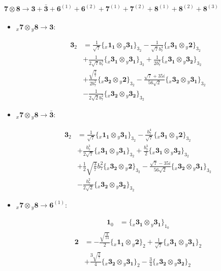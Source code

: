 \documentclass[english]{article}
\newcommand{\cgEqFontsize}{\large}
\newcommand{\rep}[1]{\mathbf{#1}}
\newcommand{\repx}[2]{{}_{#2}\mathbf{#1}}
\newcommand{\tsprod}[2]{\rep{#1}\otimes\rep{#2}}
\newcommand{\tsprodx}[2]{\repx{#1}{x}\otimes\repx{#2}{y}}
\newcommand{\subcgs}[3]{\big\{ \tsprodx{#1}{#2}\big\}^{}_{#3}}
\begin{document}
\paragraph*{\cgEqFontsize $\tsprod{7}{8}\to\rep{3}+\rep{\bar{3}}+\rep{6}^{(1)}+\rep{6}^{(2)}+\rep{7}^{(1)}+\rep{7}^{(2)}+\rep{8}^{(1)}+\rep{8}^{(2)}+\rep{8}^{(3)}$}
\begin{itemize}
\item $\tsprodx{7}{8}\to\rep{3}$:
\begin{fleqn}
\begin{align*}
\rep{3}_{2} & = \frac{1}{\sqrt{7}}\subcgs{1_{1}}{3_{1}}{3_{2}}-\frac{1}{\sqrt{7} b_7^4}\subcgs{3_{1}}{2}{3_{2}} \\ 
 & +\frac{1}{2 \sqrt{7} b_7^3}\subcgs{3_{1}}{3_{1}}{3_{2}}+\frac{1}{2 b_7^3}\subcgs{3_{1}}{3_{2}}{3_{2}} \\ 
 & +\frac{\sqrt{\frac{3}{7}}}{2 b_7^2}\subcgs{3_{2}}{2}{3_{2}}-\frac{\sqrt{7}+35 i}{56 \sqrt{2}}\subcgs{3_{2}}{3_{1}}{3_{2}} \\ 
 & -\frac{1}{2 \sqrt{2} b_7^2}\subcgs{3_{2}}{3_{2}}{3_{2}}
\end{align*}
\end{fleqn}
\item $\tsprodx{7}{8}\to\rep{\bar{3}}$:
\begin{fleqn}
\begin{align*}
\rep{3}_{2} & = \frac{1}{\sqrt{7}}\subcgs{1_{1}}{3_{1}}{3_{2}}-\frac{b_7^4}{\sqrt{7}}\subcgs{3_{1}}{2}{3_{2}} \\ 
 & +\frac{b_7^3}{2 \sqrt{7}}\subcgs{3_{1}}{3_{1}}{3_{2}}+\frac{b_7^3}{2}\subcgs{3_{1}}{3_{2}}{3_{2}} \\ 
 & +\frac{1}{2} \sqrt{\frac{3}{7}} b_7^2\subcgs{3_{2}}{2}{3_{2}}-\frac{\sqrt{7}-35 i}{56 \sqrt{2}}\subcgs{3_{2}}{3_{1}}{3_{2}} \\ 
 & -\frac{b_7^2}{2 \sqrt{2}}\subcgs{3_{2}}{3_{2}}{3_{2}}
\end{align*}
\end{fleqn}
\item $\tsprodx{7}{8}\to\rep{6}^{(1)}$:
\begin{fleqn}
\begin{align*}
\rep{1}_{0} & = \subcgs{3_{1}}{3_{1}}{1_{0}}
\end{align*}
\begin{align*}
\rep{2} & = -\frac{\sqrt{\frac{3}{14}}}{2}\subcgs{1_{1}}{2}{2}+\frac{1}{\sqrt{7}}\subcgs{3_{1}}{3_{1}}{2} \\ 
 & +\frac{3 \sqrt{\frac{3}{7}}}{4}\subcgs{3_{2}}{3_{1}}{2}-\frac{3}{4}\subcgs{3_{2}}{3_{2}}{2}

\end{align*}
\end{fleqn}
\end{itemize}
\end{document}
